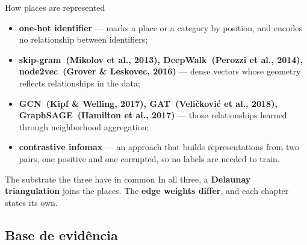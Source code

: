 \documentclass{beamer}
\begin{document}
\begin{frame}{How places are represented}
    \vfill
    \begin{itemize}\setlength{\itemsep}{4pt}
        \item \textbf{one-hot identifier} --- marks a place or a category by position, and encodes
              no relationship between identifiers;
        \item \textbf{skip-gram~{\scriptsize(Mikolov et al., 2013)}, DeepWalk~{\scriptsize(Perozzi et al., 2014)}, node2vec~{\scriptsize(Grover \& Leskovec, 2016)}} --- dense vectors whose geometry reflects
              relationships in the data;
        \item \textbf{GCN~{\scriptsize(Kipf \& Welling, 2017)}, GAT~{\scriptsize(Veličković et al., 2018)}, GraphSAGE~{\scriptsize(Hamilton et al., 2017)}} --- those relationships learned through neighborhood
              aggregation;
        \item \alert{\textbf{contrastive infomax}} --- an approach that builds representations
              from two pairs, one positive and one corrupted, so no labels are needed to train.
    \end{itemize}

    \vfill
    \begin{exampleblock}{The substrate the three have in common}
        \small
        In all three, a \textbf{Delaunay triangulation} joins the places. The \textbf{edge weights
        differ}, and each chapter states its own.
    \end{exampleblock}
\end{frame}

\subsection{Base de evidência}
\end{document}
